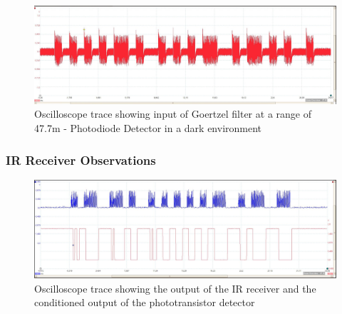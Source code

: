 \begin{figure}[H]
	\centering
	\includegraphics[width=.9\textwidth]{figures/results/drak_system_test/photodiode4770cm.jpg}
	\caption{Oscilloscope trace showing input of Goertzel filter at a range of 47.7m - Photodiode Detector in a dark environment}
	\label{fig:photodiode_range_4770cm}
\end{figure}

\subsubsection{IR Receiver Observations}

\begin{figure}[H]
	\centering
	\includegraphics[width=.9\textwidth]{figures/results/system_test/36m_phototranaistoroutput_vs_receiveroutput.JPG}
	\caption{Oscilloscope trace showing the output of the IR receiver and the conditioned output of the phototransistor detector}
	\label{fig:36m_phototranaistoroutput_vs_receiveroutput}
\end{figure}

